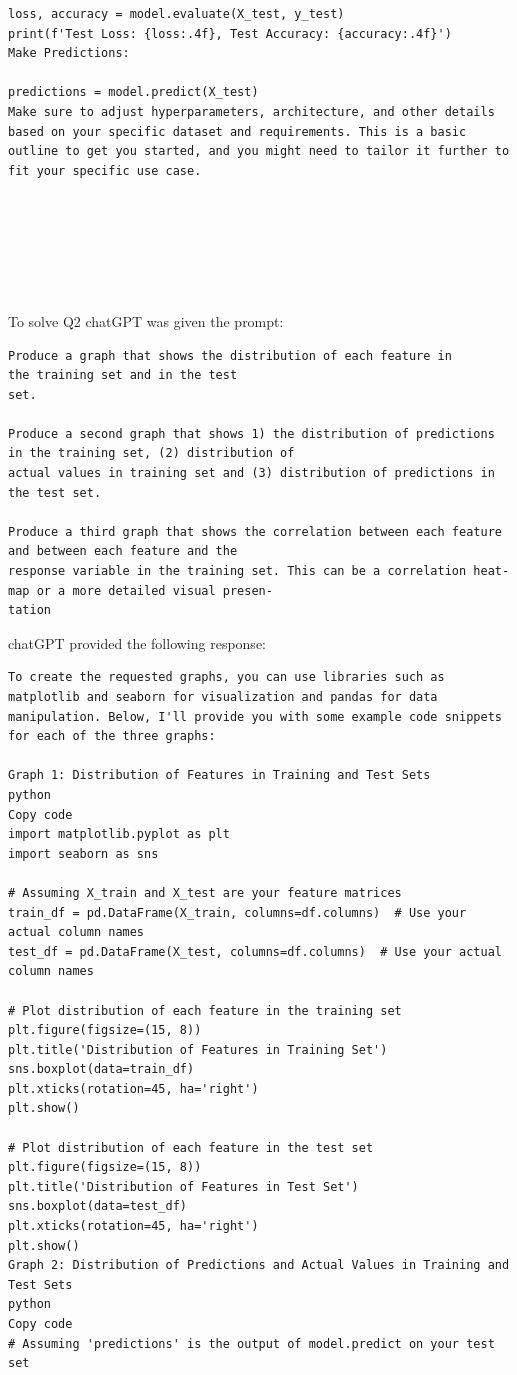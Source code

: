 \documentclass{article}
\begin{document}
\begin{titlepage}
\begin{verbatim}
loss, accuracy = model.evaluate(X_test, y_test)
print(f'Test Loss: {loss:.4f}, Test Accuracy: {accuracy:.4f}')
Make Predictions:

predictions = model.predict(X_test)
Make sure to adjust hyperparameters, architecture, and other details based on your specific dataset and requirements. This is a basic outline to get you started, and you might need to tailor it further to fit your specific use case.







\end{verbatim}
\newpage
To solve Q2 chatGPT was given the prompt:
\begin{verbatim}
Produce a graph that shows the distribution of each feature in 
the training set and in the test
set.

Produce a second graph that shows 1) the distribution of predictions in the training set, (2) distribution of
actual values in training set and (3) distribution of predictions in the test set.

Produce a third graph that shows the correlation between each feature and between each feature and the
response variable in the training set. This can be a correlation heat-map or a more detailed visual presen-
tation
\end{verbatim}
chatGPT provided the following response: 
\begin{verbatim}
To create the requested graphs, you can use libraries such as matplotlib and seaborn for visualization and pandas for data manipulation. Below, I'll provide you with some example code snippets for each of the three graphs:

Graph 1: Distribution of Features in Training and Test Sets
python
Copy code
import matplotlib.pyplot as plt
import seaborn as sns

# Assuming X_train and X_test are your feature matrices
train_df = pd.DataFrame(X_train, columns=df.columns)  # Use your actual column names
test_df = pd.DataFrame(X_test, columns=df.columns)  # Use your actual column names

# Plot distribution of each feature in the training set
plt.figure(figsize=(15, 8))
plt.title('Distribution of Features in Training Set')
sns.boxplot(data=train_df)
plt.xticks(rotation=45, ha='right')
plt.show()

# Plot distribution of each feature in the test set
plt.figure(figsize=(15, 8))
plt.title('Distribution of Features in Test Set')
sns.boxplot(data=test_df)
plt.xticks(rotation=45, ha='right')
plt.show()
Graph 2: Distribution of Predictions and Actual Values in Training and Test Sets
python
Copy code
# Assuming 'predictions' is the output of model.predict on your test set


\end{verbatim}
\end{titlepage}
\end{document}
